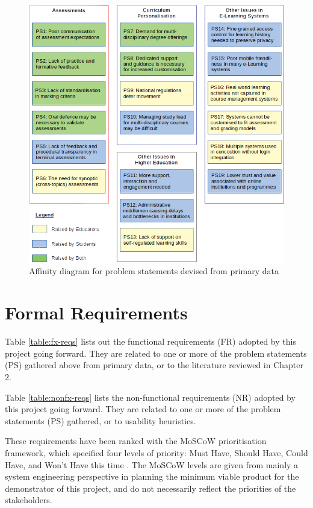 \begin{figure}[!ht] 
    \centering    
    \includegraphics[width=1.0\textwidth]{ps-affinity}
    \caption[Affinity diagram for primary data]
        {Affinity diagram for problem statements devised from primary data}
    \label{fig:ps-affinity}
\end{figure}



\section{Formal Requirements}

Table \ref{table:fx-reqs} lists out the functional requirements (FR) adopted by this 
project going forward. They are related to one or more of the problem statements (PS) gathered 
above from primary data, or to the literature reviewed in Chapter 2. 

Table \ref{table:nonfx-reqs} lists the non-functional requirements (NR) adopted by this 
project going forward. They are related to one or more of the problem statements (PS) gathered, 
or to usability heuristics.

These requirements have been ranked with the MoSCoW prioritisation
framework, which specified four levels of priority: Must Have, Should Have, Could Have, and Won’t Have 
this time \citep{agile2018moscow}. The MoSCoW levels are given from mainly a system engineering perspective 
in planning the minimum viable product for the demonstrator of this project, 
and do not necessarily reflect the priorities of the stakeholders.

